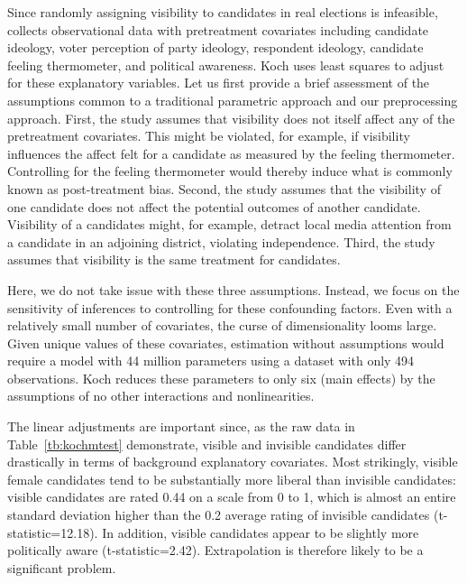 \documentclass[11pt,titlepage]{article}
\begin{document}
Since randomly assigning visibility to candidates in real elections is
infeasible, \citet{Koch02} collects observational data with
pretreatment covariates including candidate ideology, voter perception
of party ideology, respondent ideology, candidate feeling thermometer,
and political awareness.  Koch uses least squares to adjust for these
explanatory variables.  Let us first provide a brief assessment of the
assumptions common to a traditional parametric approach and our
preprocessing approach.  First, the study assumes that visibility does
not itself affect any of the pretreatment covariates.  This might be
violated, for example, if visibility influences the affect felt for a
candidate as measured by the feeling thermometer.  Controlling for the
feeling thermometer would thereby induce what is commonly known as
post-treatment bias.  Second, the study assumes that the visibility of
one candidate does not affect the potential outcomes of another
candidate.  Visibility of a candidates might, for example, detract
local media attention from a candidate in an adjoining district,
violating independence.  Third, the study assumes that visibility is
the same treatment for candidates.

Here, we do not take issue with these three assumptions.  Instead, we
focus on the sensitivity of inferences to controlling for these
confounding factors.  Even with a relatively small number of
covariates, the curse of dimensionality looms large.  Given unique
values of these covariates, estimation without assumptions would
require a model with 44 million parameters using a dataset with only
494 observations.  Koch reduces these parameters to only six (main
effects) by the assumptions of no other interactions and
nonlinearities.

The linear adjustments are important since, as the raw data in
Table~\ref{tb:kochmtest} demonstrate, visible and invisible candidates
differ drastically in terms of background explanatory covariates.
Most strikingly, visible female candidates tend to be substantially
more liberal than invisible candidates: visible candidates are rated
0.44 on a scale from 0 to 1, which is almost an entire standard
deviation higher than the 0.2 average rating of invisible candidates
(t-statistic=12.18).  In addition, visible candidates appear to be
slightly more politically aware (t-statistic=2.42).  Extrapolation is
therefore likely to be a significant problem.
\end{document}
